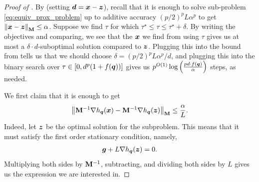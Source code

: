 \begin{proof}[Proof of ]
By  (setting $\bm{d} = \bm{x}-\bm{z}$), recall that it is enough to solve sub-problem \eqref{eq:equiv_prox_problem} up to additive accuracy $(p/2)^pL\alpha^p$ to get $\left\lVert \bm{x}-\bm{z} \right\rVert_{\mathbf{M}} \le \alpha$. Suppose we find $\tau$ for which $\tau^{\star} \le \tau \le \tau^{\star} + \delta$. By writing the objectives and comparing, we see that the $\bm{x}$ we find from using $\tau$ gives us at most a $\delta \cdot d$-suboptimal solution compared to $\bm{z}$. Plugging this into the bound from  tells us that we should choose $\delta = (p/2)^pL\alpha^p/d$, and plugging this into the binary search over $\tau \in [0,d^p(1+f(\bm{q}))]$ gives us $p^{O(1)}\log\left(\frac{pd \cdot f(\bm{q})}{\alpha}\right)$ steps, as needed.

 We first claim that it is enough to get
\begin{align*}
    \left\lVert \mathbf{M}^{-1}\nabla h_{\bm{q}}(\bm{x})-\mathbf{M}^{-1}\nabla h_{\bm{q}}(\bm{z}) \right\rVert_{\mathbf{M}} \le \frac{\alpha}{L}.
\end{align*}
Indeed, let $\bm{z}$ be the optimal solution for the subproblem. This means that it must satisfy the first order stationary condition, namely,
\begin{align*}
    \bm{g} + L\nabla h_{\bm{q}}(\bm{z}) = 0.
\end{align*}
Multiplying both sides by $\mathbf{M}^{-1}$, subtracting, and dividing both sides by $L$ gives us the expression we are interested in.


\end{proof}
